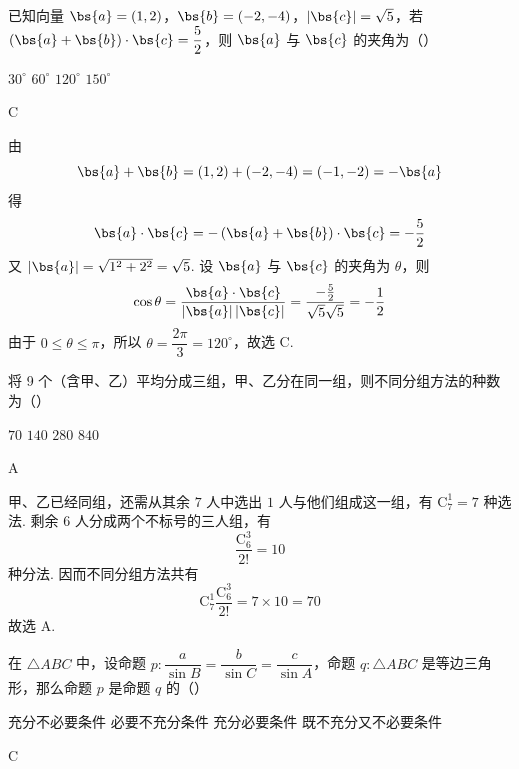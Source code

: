 \begin{problem}
已知向量 \(\bs{a}=(1,2)\)，\(\bs{b}=(-2,-4)\)，\(|\bs{c}|=\sqrt5\)，若 \((\bs{a}+\bs{b})\cdot\bs{c}=\dfrac52\)，则 \(\bs{a}\) 与 \(\bs{c}\) 的夹角为（\quad）

\choices
    {\(30^{\circ}\)}
    {\(60^{\circ}\)}
    {\(120^{\circ}\)}
    {\(150^{\circ}\)}
\end{problem}

\begin{answer}
C
\end{answer}

\begin{solution}
由
\[
\bs{a}+\bs{b}=(1,2)+(-2,-4)=(-1,-2)=-\bs{a}
\]
得
\[
\bs{a}\cdot\bs{c}=-\left(\bs{a}+\bs{b}\right)\cdot\bs{c}=-\frac52
\]
又 \(|\bs{a}|=\sqrt{1^2+2^2}=\sqrt5\). 设 \(\bs{a}\) 与 \(\bs{c}\) 的夹角为 \(\theta\)，则
\[
\cos\theta=\frac{\bs{a}\cdot\bs{c}}{|\bs{a}|\,|\bs{c}|}
=\frac{-\frac52}{\sqrt5\sqrt5}=-\frac12
\]
由于 \(0\leqslant\theta\leqslant\pi\)，所以 \(\theta=\dfrac{2\pi}{3}=120^{\circ}\)，故选 C.
\end{solution}

\begin{problem}
将 9 个（含甲、乙）平均分成三组，甲、乙分在同一组，则不同分组方法的种数为（\quad）

\choices
    {\(70\)}
    {\(140\)}
    {\(280\)}
    {\(840\)}
\end{problem}

\begin{answer}
A
\end{answer}

\begin{solution}
甲、乙已经同组，还需从其余 \(7\) 人中选出 \(1\) 人与他们组成这一组，有 \(\mathrm C_7^1=7\) 种选法. 剩余 \(6\) 人分成两个不标号的三人组，有
\[
\frac{\mathrm C_6^3}{2!}=10
\]
种分法. 因而不同分组方法共有
\[
\mathrm C_7^1\frac{\mathrm C_6^3}{2!}=7\times10=70
\]
故选 A.
\end{solution}

\begin{problem}
在 \(\triangle ABC\) 中，设命题 \(p:\dfrac{a}{\sin B}=\dfrac{b}{\sin C}=\dfrac{c}{\sin A}\)，命题 \(q:\triangle ABC\) 是等边三角形，那么命题 \(p\) 是命题 \(q\) 的（\quad）

\choices
    {充分不必要条件}
    {必要不充分条件}
    {充分必要条件}
    {既不充分又不必要条件}
\end{problem}

\begin{answer}
C
\end{answer}

